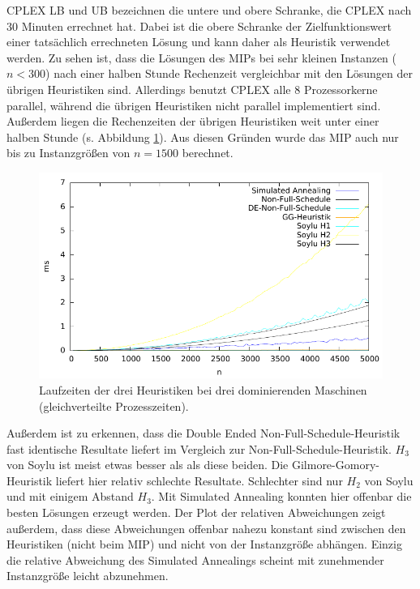 \documentclass{scrreprt}
\begin{document}
CPLEX LB und UB bezeichnen die untere und obere Schranke, die CPLEX nach 30 Minuten errechnet hat.
Dabei ist die obere Schranke der Zielfunktionswert einer tatsächlich errechneten Lösung und kann daher als Heuristik verwendet werden.
Zu sehen ist, dass die Lösungen des MIPs bei sehr kleinen Instanzen ($n<300$) nach einer halben Stunde Rechenzeit vergleichbar mit den Lösungen der übrigen Heuristiken sind.
Allerdings benutzt CPLEX alle 8 Prozessorkerne parallel, während die übrigen Heuristiken nicht parallel implementiert sind.
Außerdem liegen die Rechenzeiten der übrigen Heuristiken weit unter einer halben Stunde (s. Abbildung \ref{abb:3domtime}).
Aus diesen Gründen wurde das MIP auch nur bis zu Instanzgrößen von $n=1500$ berechnet.
\begin{figure}
    \begin{center}
        \includegraphics[width=.8\textwidth]{../instances/3dom/plottime.pdf}
    \end{center}
    \caption{
        \label{abb:3domtime}
        Laufzeiten der drei Heuristiken bei drei dominierenden Maschinen (gleichverteilte Prozesszeiten).
    }
\end{figure}

Außerdem ist zu erkennen, dass die Double Ended Non-Full-Schedule-Heuristik fast identische Resultate liefert im Vergleich zur Non-Full-Schedule-Heuristik.
$H_3$ von Soylu ist meist etwas besser als als diese beiden.
Die Gilmore-Gomory-Heuristik liefert hier relativ schlechte Resultate.
Schlechter sind nur $H_2$ von Soylu und mit einigem Abstand $H_3$.
Mit Simulated Annealing konnten hier offenbar die besten Lösungen erzeugt werden.
Der Plot der relativen Abweichungen zeigt außerdem, dass diese Abweichungen offenbar nahezu konstant sind zwischen den Heuristiken (nicht beim MIP) 
und nicht von der Instanzgröße abhängen.
Einzig die relative Abweichung des Simulated Annealings scheint mit zunehmender Instanzgröße leicht abzunehmen.
\end{document}
